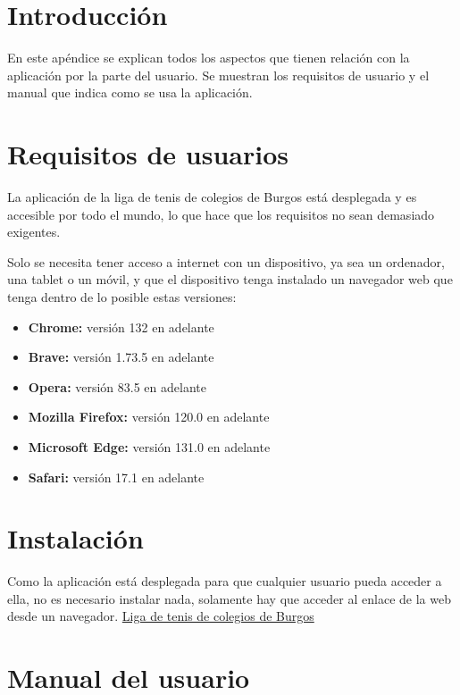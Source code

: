 
\section{Introducción}
En este apéndice se explican todos los aspectos que tienen relación con la aplicación por la parte del usuario. Se muestran los requisitos de usuario y el manual que indica como se usa la aplicación.

\section{Requisitos de usuarios}
La aplicación de la liga de tenis de colegios de Burgos está desplegada y es accesible por todo el mundo, lo que hace que los requisitos no sean demasiado exigentes. 

Solo se necesita tener acceso a internet con un dispositivo, ya sea un ordenador, una tablet o un móvil, y que el dispositivo tenga instalado un navegador web que tenga dentro de lo posible estas versiones:

\begin{itemize}
    \item 
    \textbf{Chrome:} versión 132 en adelante
    \item 
    \textbf{Brave:} versión 1.73.5 en adelante
    \item 
    \textbf{Opera:} versión 83.5 en adelante
    \item 
    \textbf{Mozilla Firefox:} versión 120.0 en adelante
    \item 
    \textbf{Microsoft Edge:} versión 131.0 en adelante
    \item 
    \textbf{Safari:} versión 17.1 en adelante
\end{itemize}


\section{Instalación}
Como la aplicación está desplegada para que cualquier usuario pueda acceder a ella, no es necesario instalar nada, solamente hay que acceder al enlace de la web desde un navegador. \href{http://ligatenisburgos.es/}{Liga de tenis de colegios de Burgos}



\section{Manual del usuario}

